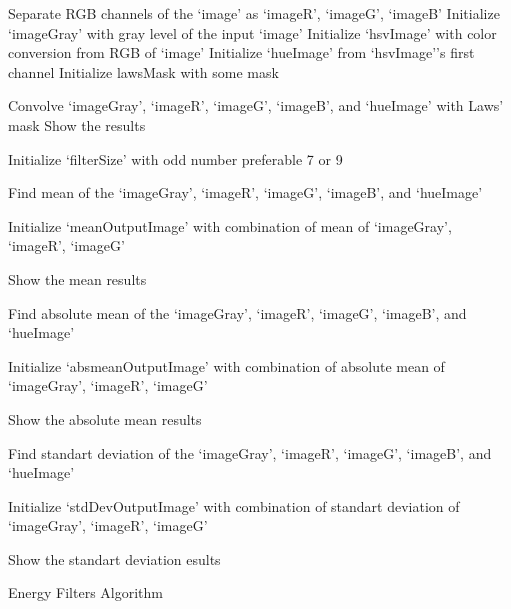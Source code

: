 \documentclass{article}
\begin{document}
\begin{algorithm}[H]
Separate RGB channels of the ‘image’ as  ‘imageR’,  ‘imageG’,  ‘imageB’\;
Initialize ‘imageGray’ with gray level of the  input ‘image’\;
Initialize  ‘hsvImage’ with color conversion from RGB of ‘image’\;
Initialize  ‘hueImage’ from ‘hsvImage’'s first channel\;
Initialize lawsMask with some mask\;

Convolve ‘imageGray’, ‘imageR’, ‘imageG’, ‘imageB’,  and ‘hueImage’ with Laws' mask\;
Show the results\;

Initialize ‘filterSize’ with odd number preferable 7 or 9\;

Find mean of the ‘imageGray’, ‘imageR’, ‘imageG’, ‘imageB’,  and ‘hueImage’\;

Initialize ‘meanOutputImage’ with combination of mean of ‘imageGray’, ‘imageR’, ‘imageG’\;

Show the mean results\;

Find absolute mean of the ‘imageGray’, ‘imageR’, ‘imageG’, ‘imageB’,  and ‘hueImage’\;

Initialize ‘absmeanOutputImage’ with combination of absolute mean of ‘imageGray’, ‘imageR’, ‘imageG’\;

Show the absolute mean results\;

Find standart deviation of the ‘imageGray’, ‘imageR’, ‘imageG’, ‘imageB’,  and ‘hueImage’\;

Initialize ‘stdDevOutputImage’ with combination of standart deviation of ‘imageGray’, ‘imageR’, ‘imageG’\;

Show the standart deviation esults\;

 \caption{Energy Filters Algorithm}
\end{algorithm}
\end{document}
